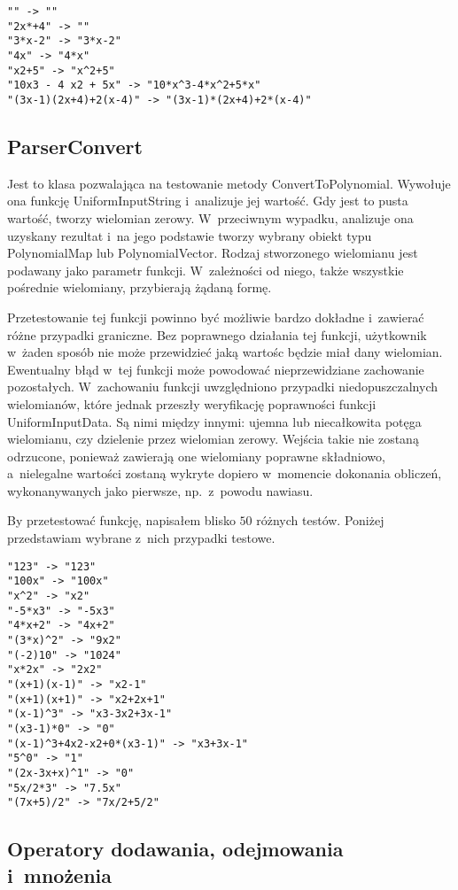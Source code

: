 \begin{lstlisting}
"" -> ""
"2x*+4" -> ""
"3*x-2" -> "3*x-2"
"4x" -> "4*x"
"x2+5" -> "x^2+5"
"10x3 - 4 x2 + 5x" -> "10*x^3-4*x^2+5*x"
"(3x-1)(2x+4)+2(x-4)" -> "(3x-1)*(2x+4)+2*(x-4)"
\end{lstlisting}

\subsection{ParserConvert}

Jest to klasa pozwalająca na testowanie metody ConvertToPolynomial. Wywołuje ona funkcję UniformInputString i~analizuje jej wartość. Gdy jest to pusta wartość, tworzy wielomian zerowy. W~przeciwnym wypadku, analizuje ona uzyskany rezultat i~na jego podstawie tworzy wybrany obiekt typu PolynomialMap lub PolynomialVector. Rodzaj stworzonego wielomianu jest podawany jako parametr funkcji. W~zależności od niego, także wszystkie pośrednie wielomiany, przybierają żądaną formę.

Przetestowanie tej funkcji powinno być możliwie bardzo dokładne i~zawierać różne przypadki graniczne. Bez poprawnego działania tej funkcji, użytkownik w~żaden sposób nie może przewidzieć jaką wartośc będzie miał dany wielomian. Ewentualny błąd w~tej funkcji może powodować nieprzewidziane zachowanie pozostałych. W~zachowaniu funkcji uwzględniono przypadki niedopuszczalnych wielomianów, które jednak przeszły weryfikację poprawności funkcji UniformInputData. Są nimi między innymi: ujemna lub niecałkowita potęga wielomianu, czy dzielenie przez wielomian zerowy. Wejścia takie nie zostaną odrzucone, ponieważ zawierają one wielomiany poprawne składniowo, a~nielegalne wartości zostaną wykryte dopiero w~momencie dokonania obliczeń, wykonanywanych jako pierwsze, np.\ z~powodu nawiasu.

By przetestować funkcję, napisałem blisko $50$ różnych testów. Poniżej przedstawiam wybrane z~nich przypadki testowe.

\begin{lstlisting}
"123" -> "123"
"100x" -> "100x"
"x^2" -> "x2"
"-5*x3" -> "-5x3"
"4*x+2" -> "4x+2"
"(3*x)^2" -> "9x2"
"(-2)10" -> "1024"
"x*2x" -> "2x2"
"(x+1)(x-1)" -> "x2-1"
"(x+1)(x+1)" -> "x2+2x+1"
"(x-1)^3" -> "x3-3x2+3x-1"
"(x3-1)*0" -> "0"
"(x-1)^3+4x2-x2+0*(x3-1)" -> "x3+3x-1"
"5^0" -> "1"
"(2x-3x+x)^1" -> "0"
"5x/2*3" -> "7.5x"
"(7x+5)/2" -> "7x/2+5/2"
\end{lstlisting}

\subsection{Operatory dodawania, odejmowania i~mnożenia}

